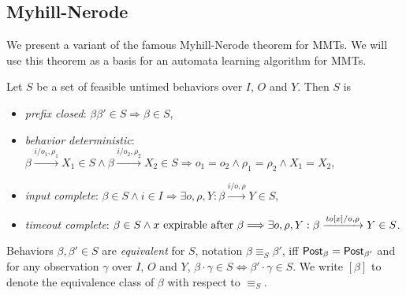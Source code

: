 \subsection{Myhill-Nerode}  
We present a variant of the famous Myhill-Nerode theorem for MMTs.
We will use this theorem as a basis for an automata learning algorithm for MMTs.

\begin{definition}
Let $S$ be a set of feasible untimed behaviors over $I$, $O$ and $Y$. Then $S$ is
\begin{itemize}
\item
\emph{prefix closed}: $\beta \beta' \in S \Longrightarrow \beta \in S$,
\item
\emph{behavior deterministic}:
$\beta \xrightarrow{i/o_1, \rho_1} X_1 \in S \wedge \beta \xrightarrow{i/o_2, \rho_2} X_2 \in S \Longrightarrow o_1 = o_2 \wedge \rho_1 = \rho_2 \wedge X_1 = X_2$,
\item
\emph{input complete}:
$\beta \in S \wedge i \in I \Longrightarrow \exists o, \rho, Y : \beta \xrightarrow{i/o, \rho} Y \in S$,
\item
\emph{timeout complete}:
$\beta \in S \wedge x \mbox{ expirable after } \beta \Longrightarrow
\exists o, \rho, Y: \beta \xrightarrow{\mathit{to}[x]/o, \rho} Y \in S$.
\end{itemize}
Behaviors $\beta, \beta' \in S$ are \emph{equivalent} for $S$, notation $\beta \equiv_S \beta'$, iff 
$\mathsf{Post}_{\beta} = \mathsf{Post}_{\beta'}$ and for any observation
$\gamma$ over $I$, $O$ and $Y$, $\beta \cdot \gamma \in S \Leftrightarrow \beta' \cdot \gamma \in S$.
We write $[\beta]$ to denote the equivalence class of $\beta$ with respect to $\equiv_S$.
\end{definition}

